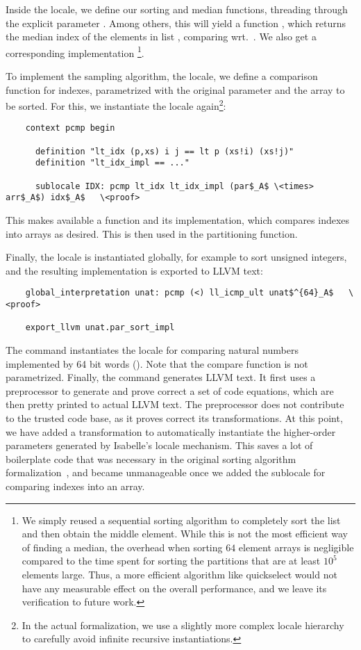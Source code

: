 \documentclass[runningheads]{llncs}
\begin{document}
  Inside the  locale, we define our sorting and median functions, threading through the explicit parameter .
  Among others, this will yield a function , which returns the median index of the elements in list ,
  comparing wrt.\ . We also get a corresponding implementation \footnote{We simply reused a sequential sorting algorithm to completely sort the list and then obtain the middle element. While this is not the most efficient way of finding a median, the overhead when sorting $64$ element arrays is negligible compared to the time spent for sorting the partitions that are at least $10^5$ elements large. Thus, a more efficient algorithm like quickselect would not have any measurable effect on the overall performance, and we leave its verification to future work.}.

  To implement the sampling algorithm,  the  locale, we define
  a comparison function for indexes, parametrized with the original parameter and the array to be sorted.
  For this, we instantiate the  locale again\footnote{In the actual formalization, we use a slightly more complex locale hierarchy to carefully avoid infinite recursive instantiations.}:

  \begin{lstlisting}
    context pcmp begin

      definition "lt_idx (p,xs) i j == lt p (xs!i) (xs!j)"
      definition "lt_idx_impl == ..."

      sublocale IDX: pcmp lt_idx lt_idx_impl (par$_A$ \<times> arr$_A$) idx$_A$   \<proof>

  \end{lstlisting}
  This makes available a function  and its implementation, which compares indexes into arrays as desired.
  This is then used in the partitioning function.

  Finally, the  locale is instantiated globally, for example to sort unsigned integers, and the resulting implementation is
  exported to LLVM text:
  \begin{lstlisting}
    global_interpretation unat: pcmp (<) ll_icmp_ult unat$^{64}_A$   \<proof>

    export_llvm unat.par_sort_impl
  \end{lstlisting}
  The  command instantiates the locale for comparing natural
  numbers implemented by 64 bit words (). Note that the compare function is not
  parametrized. Finally, the  command generates LLVM text.
  It first uses a preprocessor to generate and prove correct a set of code equations, which are then pretty printed to actual LLVM text.
  The preprocessor does not contribute to the trusted code base, as it proves correct its transformations.
  At this point, we have added a transformation to automatically instantiate the higher-order parameters generated by Isabelle's locale mechanism.
  This saves a lot of boilerplate code that was necessary in the original sorting algorithm formalization~\cite{La20}, and became unmanageable
  once we added the sublocale for comparing indexes into an array.
\end{document}
